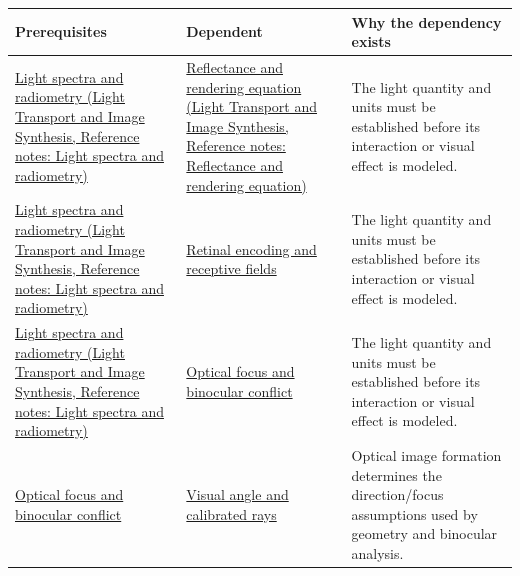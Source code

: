 {\def\LTcaptype{none} %
\begin{longtable}[]{@{}
  >{\raggedright\arraybackslash}p{}
  >{\raggedright\arraybackslash}p{}
  >{\raggedright\arraybackslash}p{}@{}}
\toprule\noalign{}
\begin{minipage}[b]{\linewidth}\raggedright
Prerequisites
\end{minipage} & \begin{minipage}[b]{\linewidth}\raggedright
Dependent
\end{minipage} & \begin{minipage}[b]{\linewidth}\raggedright
Why the dependency exists
\end{minipage} \\
\midrule\noalign{}
\endhead
\bottomrule\noalign{}
\endlastfoot
\href{../04-Light-Transport-and-Image-Synthesis/main.pdf\#nameddest=appendix-215c2570199b}{Light spectra and radiometry (Light Transport and Image Synthesis, Reference notes: Light spectra and radiometry)} & \href{../04-Light-Transport-and-Image-Synthesis/main.pdf\#nameddest=appendix-96da0b153b77}{Reflectance and rendering equation (Light Transport and Image Synthesis, Reference notes: Reflectance and rendering equation)} & The light quantity and units must be established before its interaction or visual effect is modeled. \\
\href{../04-Light-Transport-and-Image-Synthesis/main.pdf\#nameddest=appendix-215c2570199b}{Light spectra and radiometry (Light Transport and Image Synthesis, Reference notes: Light spectra and radiometry)} & \hyperref[appendix-7281c15ac44a]{Retinal encoding and receptive fields} & The light quantity and units must be established before its interaction or visual effect is modeled. \\
\href{../04-Light-Transport-and-Image-Synthesis/main.pdf\#nameddest=appendix-215c2570199b}{Light spectra and radiometry (Light Transport and Image Synthesis, Reference notes: Light spectra and radiometry)} & \hyperref[appendix-f90cee1be7a4]{Optical focus and binocular conflict} & The light quantity and units must be established before its interaction or visual effect is modeled. \\
\hyperref[appendix-f90cee1be7a4]{Optical focus and binocular conflict} & \hyperref[appendix-7d356c396d1a]{Visual angle and calibrated rays} & Optical image formation determines the direction/focus assumptions used by geometry and binocular analysis. \\

\end{longtable}}
